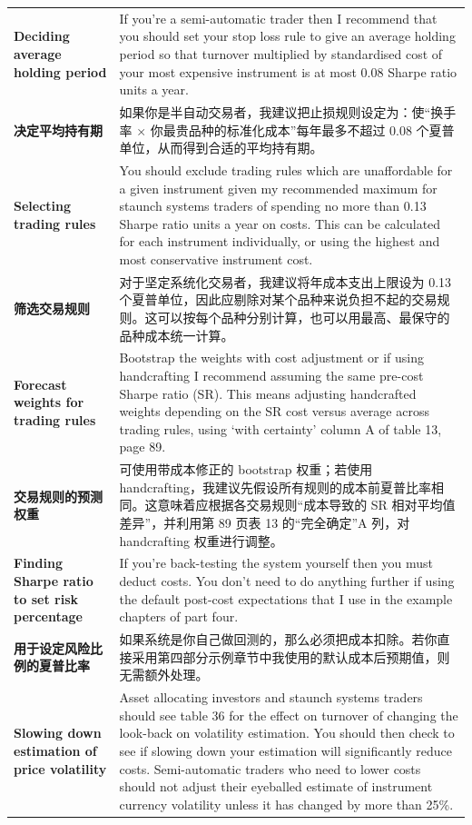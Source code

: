 \begin{bilingualtableblock}
{\begin{tabularx}{\textwidth}{@{} p{} Y@{}}
\textbf{Deciding average holding period} & If you're a semi-automatic trader then I recommend that you should set your stop loss rule to give an average holding period so that turnover multiplied by standardised cost of your most expensive instrument is at most 0.08 Sharpe ratio units a year. \\
\textbf{决定平均持有期} & 如果你是半自动交易者，我建议把止损规则设定为：使“换手率 × 你最贵品种的标准化成本”每年最多不超过 0.08 个夏普单位，从而得到合适的平均持有期。 \\
\textbf{Selecting trading rules} & You should exclude trading rules which are unaffordable for a given instrument given my recommended maximum for staunch systems traders of spending no more than 0.13 Sharpe ratio units a year on costs. This can be calculated for each instrument individually, or using the highest and most conservative instrument cost. \\
\textbf{筛选交易规则} & 对于坚定系统化交易者，我建议将年成本支出上限设为 0.13 个夏普单位，因此应剔除对某个品种来说负担不起的交易规则。这可以按每个品种分别计算，也可以用最高、最保守的品种成本统一计算。 \\
\textbf{Forecast weights for trading rules} & Bootstrap the weights with cost adjustment or if using handcrafting I recommend assuming the same pre-cost Sharpe ratio (SR). This means adjusting handcrafted weights depending on the SR cost versus average across trading rules, using ‘with certainty' column A of table 13, page 89. \\
\textbf{交易规则的预测权重} & 可使用带成本修正的 bootstrap 权重；若使用 handcrafting，我建议先假设所有规则的成本前夏普比率相同。这意味着应根据各交易规则“成本导致的 SR 相对平均值差异”，并利用第 89 页表 13 的“完全确定”A 列，对 handcrafting 权重进行调整。 \\
\textbf{Finding Sharpe ratio to set risk percentage} & If you're back-testing the system yourself then you must deduct costs. You don't need to do anything further if using the default post-cost expectations that I use in the example chapters of part four. \\
\textbf{用于设定风险比例的夏普比率} & 如果系统是你自己做回测的，那么必须把成本扣除。若你直接采用第四部分示例章节中我使用的默认成本后预期值，则无需额外处理。 \\
\textbf{Slowing down estimation of price volatility} & Asset allocating investors and staunch systems traders should see table 36 for the effect on turnover of changing the look-back on volatility estimation. You should then check to see if slowing down your estimation will significantly reduce costs. Semi-automatic traders who need to lower costs should not adjust their eyeballed estimate of instrument currency volatility unless it has changed by more than 25\%. \\

\end{tabularx}}
\end{bilingualtableblock}
